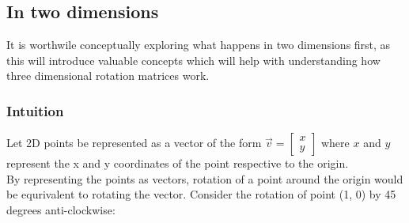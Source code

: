 \documentclass[12pt, a4paper]{article}
\begin{document}
\subsection{In two dimensions}
It is worthwile conceptually exploring what happens in two dimensions first, as
this will introduce valuable concepts which will help with understanding how
three dimensional rotation matrices work. \\

\subsubsection{Intuition}

Let 2D points be represented as a vector of the form $\vec{v} = \begin{bmatrix}x
        \\ y\end{bmatrix}$ where $x$ and $y$ represent the x and y coordinates of the
point respective to the origin. \\

By representing the points as vectors, rotation of a point around the origin
would be equrivalent to rotating the vector. Consider the rotation of point (1,
0) by 45 degrees anti-clockwise:
\end{document}
